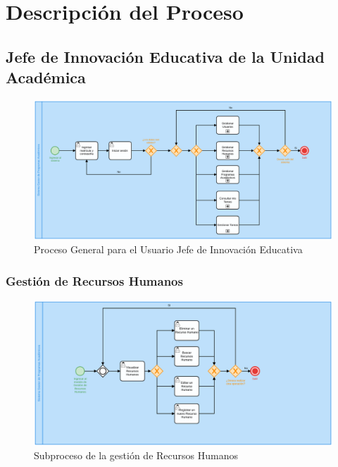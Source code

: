 \chapter{Descripción del Proceso}
        \section{Jefe de Innovación Educativa de la Unidad Académica}
        \begin{figure}[H]
        	\centering
        	\hypertarget{BPMNG}{\includegraphics[width=\linewidth]{images/SP1/ProcesoGeneral}
        	\caption{Proceso General para el Usuario Jefe de Innovación Educativa}}
        	\label{BPMNG}
        \end{figure}
        \newpage
    	\subsection{Gestión de Recursos Humanos}

        \begin{figure}[H]
        	\centering
        	\hypertarget{BPMNGRH}{\includegraphics[width=\linewidth]{images/SP1/gestionRH.png}}
        	\caption{Subproceso de la gestión de Recursos Humanos}
        	\label{BPMNGRH}
        \end{figure}


